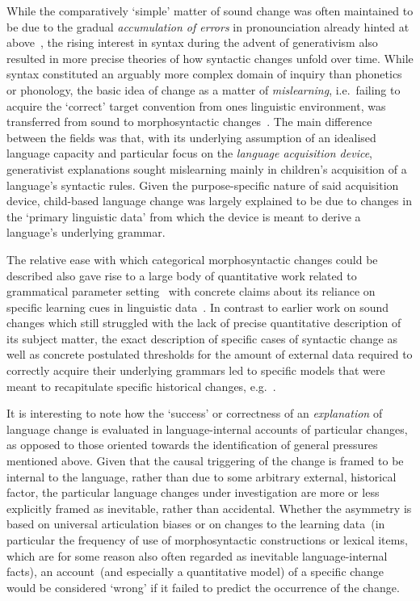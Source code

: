 While the comparatively `simple' matter of sound change was often maintained to be due to the gradual \emph{accumulation of errors} in pronounciation already hinted at above~\citep[see e.g.][for a textbook account of the general principle]{Hockett1958}, the rising interest in syntax during the advent of generativism also resulted in more precise theories of how syntactic changes unfold over time. While syntax constituted an arguably more complex domain of inquiry than phonetics or phonology, the basic idea of change as a matter of \emph{mislearning}, i.e.~failing to acquire the `correct' target convention from ones linguistic environment, was transferred from sound to morphosyntactic changes~\citep{Salmons2013}.
The main difference between the fields was that, with its underlying assumption of an idealised language capacity and particular focus on the \emph{language acquisition device}, generativist explanations sought mislearning mainly in children's acquisition of a language's syntactic rules. Given the purpose-specific nature of said acquisition device, child-based language change was largely explained to be due to changes in the `primary linguistic data' from which the device is meant to derive a language's underlying grammar.

The relative ease with which categorical morphosyntactic changes could be described also gave rise to a large body of quantitative work related to grammatical parameter setting~\citep{Lightfoot1991} with concrete claims about its reliance on specific learning cues in linguistic data~\citep{Gibson1994}.
In contrast to earlier work on sound changes which still struggled with the lack of precise quantitative description of its subject matter, the exact description of specific cases of syntactic change as well as concrete postulated thresholds for the amount of external data required to correctly acquire their underlying grammars led to specific models that were meant to recapitulate specific historical changes, e.g.~\citep{Yang2002}.

It is interesting to note how the `success' or correctness of an \emph{explanation} of language change is evaluated in language-internal accounts of particular changes, as opposed to those oriented towards the identification of general pressures mentioned above.
Given that the causal triggering of the change is framed to be internal to the language, rather than due to some arbitrary external, historical factor, the particular language changes under investigation are more or less explicitly framed as inevitable, rather than accidental.
Whether the asymmetry is based on universal articulation biases or on changes to the learning data~(in particular the frequency of use of morphosyntactic constructions or lexical items, which are for some reason also often regarded as inevitable language-internal facts), an account~(and especially a quantitative model) of a specific change would be considered `wrong' if it failed to predict the occurrence of the change.

